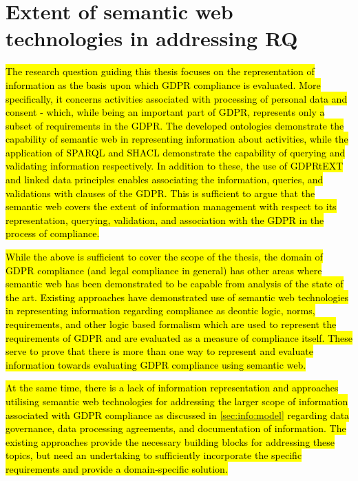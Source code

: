 \section{Extent of semantic web technologies in addressing RQ}
\hl{The research question guiding this thesis focuses on the representation of information as the basis upon which GDPR compliance is evaluated.
More specifically, it concerns activities associated with processing of personal data and consent - which, while being an important part of GDPR, represents only a subset of requirements in the GDPR.
The developed ontologies demonstrate the capability of semantic web in representing information about activities, while the application of SPARQL and SHACL demonstrate the capability of querying and validating information respectively. In addition to these, the use of GDPRtEXT and linked data principles enables associating the information, queries, and validations with clauses of the GDPR.
This is sufficient to argue that the semantic web covers the extent of information management with respect to its representation, querying, validation, and association with the GDPR in the process of compliance.}

\hl{While the above is sufficient to cover the scope of the thesis, the domain of GDPR compliance (and legal compliance in general) has other areas where semantic web has been demonstrated to be capable from analysis of the state of the art.
Existing approaches have demonstrated use of semantic web technologies in representing information regarding compliance as deontic logic, norms, requirements, and other logic based formalism which are used to represent the requirements of GDPR and are evaluated as a measure of compliance itself.
These serve to prove that there is more than one way to represent and evaluate information towards evaluating GDPR compliance using semantic web.}

\hl{At the same time, there is a lack of information representation and approaches utilising semantic web technologies for addressing the larger scope of information associated with GDPR compliance as discussed in \autoref{sec:info:model} regarding data governance, data processing agreements, and documentation of information.
The existing approaches provide the necessary building blocks for addressing these topics, but need an undertaking to sufficiently incorporate the specific requirements and provide a domain-specific solution.}

